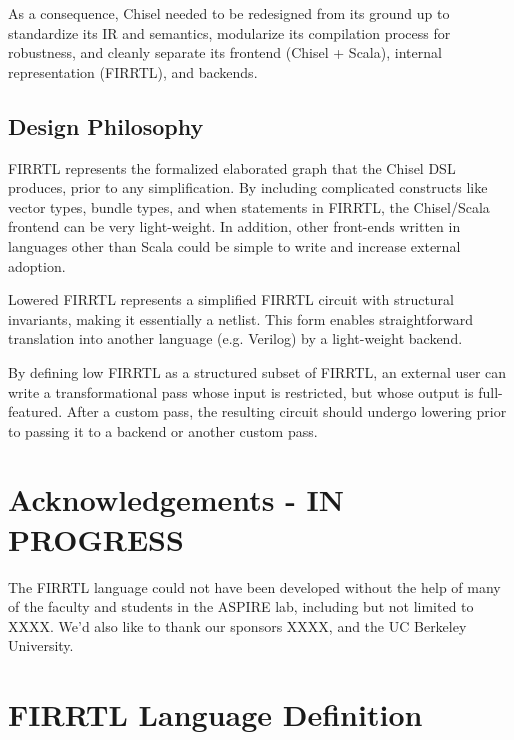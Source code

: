 \documentclass[12pt]{article}
\begin{document}
As a consequence, Chisel needed to be redesigned from its ground up to standardize its IR and semantics, modularize its compilation process for robustness, and cleanly separate its frontend (Chisel + Scala), internal representation (FIRRTL), and backends.

\subsection{Design Philosophy}
FIRRTL represents the formalized elaborated graph that the Chisel DSL produces, prior to any simplification.
By including complicated constructs like vector types, bundle types, and when statements in FIRRTL, the Chisel/Scala frontend can be very light-weight.
In addition, other front-ends written in languages other than Scala could be simple to write and increase external adoption.

Lowered FIRRTL represents a simplified FIRRTL circuit with structural invariants, making it essentially a netlist.
This form enables straightforward translation into another language (e.g. Verilog) by a light-weight backend.

By defining low FIRRTL as a structured subset of FIRRTL, an external user can write a transformational pass whose input is restricted, but whose output is full-featured.
After a custom pass, the resulting circuit should undergo lowering prior to passing it to a backend or another custom pass.

\section{Acknowledgements - IN PROGRESS}
The FIRRTL language could not have been developed without the help of many of the faculty and students in the ASPIRE lab, including but not limited to XXXX.
We'd also like to thank our sponsors XXXX, and the UC Berkeley University.

\section{FIRRTL Language Definition}
\end{document}
